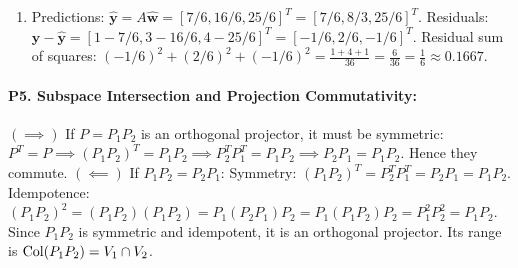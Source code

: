 \begin{enumerate}[label=(\alph*)]
\begin{equation*}
    \end{equation*}
    Fitted line is $y = \frac{7}{6} + \frac{3}{2}x$.
    \item Predictions: $\hat{\mathbf{y}} = A\hat{\mathbf{w}} = [7/6, 16/6, 25/6]^T = [7/6, 8/3, 25/6]^T$.
    Residuals: $\mathbf{y} - \hat{\mathbf{y}} = [1 - 7/6, 3 - 16/6, 4 - 25/6]^T = [-1/6, 2/6, -1/6]^T$.
    Residual sum of squares: $(-1/6)^2 + (2/6)^2 + (-1/6)^2 = \frac{1 + 4 + 1}{36} = \frac{6}{36} = \frac{1}{6} \approx 0.1667$.
\end{enumerate}

\paragraph{P5. Subspace Intersection and Projection Commutativity:}
$(\implies)$ If $P = P_1 P_2$ is an orthogonal projector, it must be symmetric: $P^T = P \implies (P_1 P_2)^T = P_1 P_2 \implies P_2^T P_1^T = P_1 P_2 \implies P_2 P_1 = P_1 P_2$. Hence they commute.
$(\impliedby)$ If $P_1 P_2 = P_2 P_1$:
Symmetry: $(P_1 P_2)^T = P_2^T P_1^T = P_2 P_1 = P_1 P_2$.
Idempotence: $(P_1 P_2)^2 = (P_1 P_2)(P_1 P_2) = P_1 (P_2 P_1) P_2 = P_1 (P_1 P_2) P_2 = P_1^2 P_2^2 = P_1 P_2$.
Since $P_1 P_2$ is symmetric and idempotent, it is an orthogonal projector. Its range is $\operatorname{Col}(P_1 P_2) = V_1 \cap V_2$.

